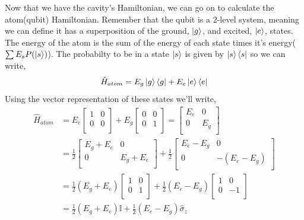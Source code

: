 \documentclass{article}
\numberwithin{equation}{section} %
\begin{document}
Now that we have the cavity's Hamiltonian, we can go on to calculate the atom(qubit) Hamiltonian. \newline
Remember that the qubit is a 2-level system, meaning we can define it has a superposition of the ground, $\ket{g}$, and excited, $\ket{e}$, states. The energy of the atom is the sum of the energy of each state times it's energy($\sum E_sP(\ket{s})$). The probabilty to be in a state $\ket{s}$ is given by $\ket{s}\bra{s}$ so we can write,
\begin{equation}
    \hat{H}_{atom} = E_g\ket{g}\bra{g} + E_e\ket{e}\bra{e}
\end{equation}
Using the vector representation of these states we'll write,
    \begin{align*} 
        \hat{H}_{atom} &= 
        E_e \begin{bmatrix}
        1 & 0     \\
        0   & 0   \\
        \end{bmatrix}
        + E_g \begin{bmatrix}
        0 & 0     \\
        0   & 1   \\
        \end{bmatrix} = 
        \begin{bmatrix}
        E_e & 0     \\
        0   & E_g   \\
        \end{bmatrix} \\
        &= \frac{1}{2}\begin{bmatrix}
        E_g + E_e & 0          \\
        0         & E_g + E_e  \\
        \end{bmatrix} +
        \frac{1}{2}\begin{bmatrix}
        E_e - E_g & 0          \\
        0         & -(E_e - E_g)  \\
        \end{bmatrix} \\
        &= \frac{1}{2}(E_g + E_e)\begin{bmatrix}
        1 & 0          \\
        0         & 1  \\
        \end{bmatrix} +
        \frac{1}{2}(E_e - E_g)\begin{bmatrix}
        1 & 0          \\
        0         & -1  \\
        \end{bmatrix} \\
        &= \frac{1}{2}(E_g + E_e)\mathbb{I} + \frac{1}{2}(E_e - E_g)\hat{\sigma}_z
    \end{align*}
\end{document}
